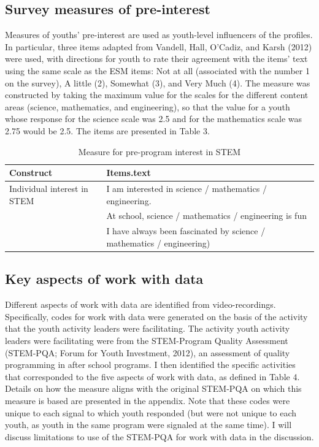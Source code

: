 \documentclass[]{book}
\theoremstyle{definition}
\theoremstyle{definition}
\theoremstyle{definition}
\theoremstyle{remark}
\begin{document}
\subsection{Survey measures of
pre-interest}\label{survey-measures-of-pre-interest}

Measures of youths' pre-interest are used as youth-level influencers of
the profiles. In particular, three items adapted from Vandell, Hall,
O'Cadiz, and Karsh (2012) were used, with directions for youth to rate
their agreement with the items' text using the same scale as the ESM
items: Not at all (associated with the number 1 on the survey), A little
(2), Somewhat (3), and Very Much (4). The measure was constructed by
taking the maximum value for the scales for the different content areas
(science, mathematics, and engineering), so that the value for a youth
whose response for the science scale was 2.5 and for the mathematics
scale was 2.75 would be 2.5. The items are presented in Table 3.

\begin{table}

\caption{\label{tab:unnamed-chunk-5}Measure for pre-program interest in STEM}
\centering
\begin{tabular}[t]{ll}
\toprule
Construct & Items.text\\
\midrule
Individual interest in STEM & I am interested in science / mathematics / engineering.\\
 & At school, science / mathematics / engineering is fun\\
 & I have always been fascinated by science / mathematics / engineering)\\
\bottomrule
\end{tabular}
\end{table}

\subsection{Key aspects of work with
data}\label{key-aspects-of-work-with-data}

Different aspects of work with data are identified from
video-recordings. Specifically, codes for work with data were generated
on the basis of the activity that the youth activity leaders were
facilitating. The activity youth activity leaders were facilitating were
from the STEM-Program Quality Assessment (STEM-PQA; Forum for Youth
Investment, 2012), an assessment of quality programming in after school
programs. I then identified the specific activities that corresponded to
the five aspects of work with data, as defined in Table 4. Details on
how the measure aligns with the original STEM-PQA on which this measure
is based are presented in the appendix. Note that these codes were
unique to each signal to which youth responded (but were not unique to
each youth, as youth in the same program were signaled at the same
time). I will discuss limitations to use of the STEM-PQA for work with
data in the discussion.
\end{document}
